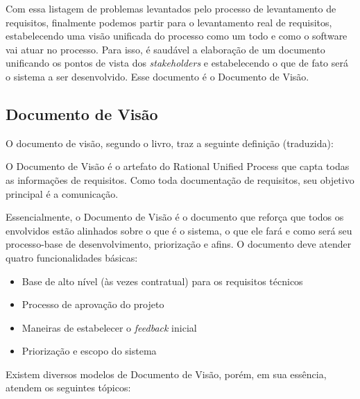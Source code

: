 Com essa listagem de problemas levantados pelo processo de levantamento de requisitos, finalmente podemos partir para o levantamento real de requisitos, estabelecendo uma visão unificada do processo como um todo e como o software vai atuar no processo. Para isso, é saudável a elaboração de um documento unificando os pontos de vista dos \textit{stakeholders} e estabelecendo o que de fato será o sistema a ser desenvolvido. Esse documento é o Documento de Visão.

\subsection{Documento de Visão}

O documento de visão, segundo o livro\cite{kurtbittnerianspence2002}, traz a seguinte definição (traduzida):

\begin{citacaoLonga}
O Documento de Visão é o artefato do Rational Unified Process\cite{ibm2011} que capta todas as informações de requisitos. Como toda documentação de requisitos, seu objetivo principal é a comunicação.
\end{citacaoLonga}

Essencialmente, o Documento de Visão é o documento que reforça que todos os envolvidos estão alinhados sobre o que é o sistema, o que ele fará e como será seu processo-base de desenvolvimento, priorização e afins. O documento deve atender quatro funcionalidades básicas:

\begin{itemize}
    \item Base de alto nível (às vezes contratual) para os requisitos técnicos
    \item Processo de aprovação do projeto
    \item Maneiras de estabelecer o \textit{feedback} inicial
    \item Priorização e escopo do sistema
\end{itemize}

Existem diversos modelos de Documento de Visão, porém, em sua essência, atendem os seguintes tópicos\cite{kurtbittnerianspence2002}:

